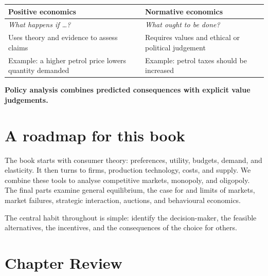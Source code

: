 \begin{keyidea}
\begin{center}
\begin{tabular}{p{}p{}}
\textbf{\color{PPEBurgundy}Positive economics} & \textbf{\color{PPENavarraRed}Normative economics} \\
\midrule
\textit{What happens if \ldots?} & \textit{What ought to be done?} \\
Uses theory and evidence to assess claims & Requires values and ethical or political judgement \\
Example: a higher petrol price lowers quantity demanded & Example: petrol taxes should be increased \\
\end{tabular}
\end{center}
\smallskip
\textbf{Policy analysis combines predicted consequences with explicit value judgements.}
\end{keyidea}

\section{A roadmap for this book}

The book starts with consumer theory: preferences, utility, budgets, demand,
and elasticity. It then turns to firms, production technology, costs, and
supply. We combine these tools to analyse competitive markets, monopoly, and
oligopoly. The final parts examine general equilibrium, the case for and
limits of markets, market failures, strategic interaction, auctions, and
behavioural economics.

The central habit throughout is simple: identify the decision-maker, the feasible alternatives, the incentives, and the consequences of the choice for others.

\section*{Chapter Review}

